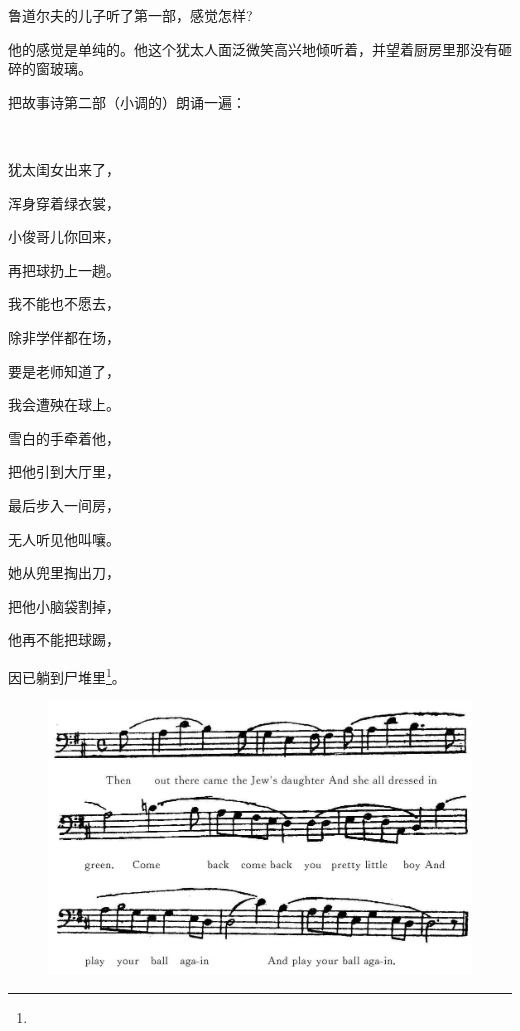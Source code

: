\par 鲁道尔夫的儿子听了第一部，感觉怎样?
\par 他的感觉是单纯的。他这个犹太人面泛微笑高兴地倾听着，并望着厨房里那没有砸碎的窗玻璃。
\par 把故事诗第二部（小调的）朗诵一遍：
\par  
\par 犹太闺女出来了，
\par 浑身穿着绿衣裳，
\par 小俊哥儿你回来，
\par 再把球扔上一趟。
\par 我不能也不愿去，
\par 除非学伴都在场，
\par 要是老师知道了，
\par 我会遭殃在球上。
\par 雪白的手牵着他，
\par 把他引到大厅里，
\par 最后步入一间房，
\par 无人听见他叫嚷。
\par 她从兜里掏出刀，
\par 把他小脑袋割掉，
\par 他再不能把球踢，
\par 因已躺到尸堆里\footnote{}。

\begin{figure}[htb]
    \centering
    \includegraphics[scale=0.3]{picture/尤利西斯3.jpeg}
\end{figure}

